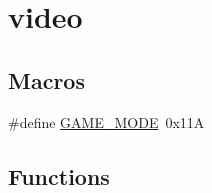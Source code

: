 \hypertarget{group__video}{}\section{video}
\label{group__video}
\subsection*{Macros}
\begin{DoxyCompactItemize}
\item 
\#define \mbox{\hyperlink{group__video_ga0e6eed752f69ec92baec7d38a6ff3f04}{G\+A\+M\+E\+\_\+\+M\+O\+DE}}~0x11A
\end{DoxyCompactItemize}
\subsection*{Functions}
